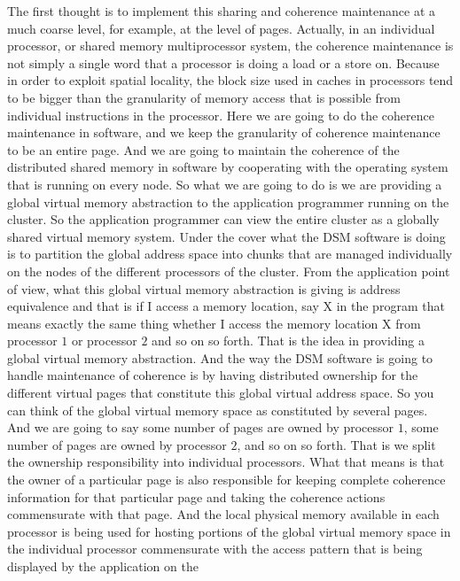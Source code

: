 \documentclass[11pt]{lecture}
\begin{document}
The first thought is to implement this sharing and coherence maintenance at a much coarse level, for example, 
at the level of pages. Actually, in an individual processor, or shared memory multiprocessor system, the 
coherence maintenance is not simply a single word that a processor is doing a load or a store on. Because 
in order to exploit spatial locality, the block size used in caches in processors tend to be bigger than the 
granularity of memory access that is possible from individual instructions in the processor. Here we are going to do 
the coherence maintenance in software, and we keep the granularity of coherence maintenance to be an 
entire page. And we are going to maintain the coherence of the distributed shared memory in software by cooperating with 
the operating system that is running on every node. So what we are going to do is we are providing a global 
virtual memory abstraction to the application programmer running on the cluster. So the application programmer 
can view the entire cluster as a globally shared virtual memory system. Under the cover what the DSM software 
is doing is to partition the global address space into chunks that are managed individually on the nodes of the different 
processors of the cluster. From the application point of view, what this global virtual memory abstraction is 
giving is address equivalence and that is if I access a memory location, say {\code X} in the program 
that means exactly the same thing whether I access the memory location {\code X} from processor $1$ or 
processor $2$ and so on so forth. That is the idea in providing a global virtual memory abstraction. And 
the way the DSM software is going to handle maintenance of coherence is by having distributed ownership for 
the different virtual pages that constitute this global virtual address space. So you can think of the global 
virtual memory space as constituted by several pages. And we are going to say some number of pages are 
owned by processor $1$, some number of pages are owned by processor $2$, and so on so forth. That is 
we split the ownership responsibility into individual processors. What that means is that the owner of 
a particular page is also responsible for keeping complete coherence information for that particular page and 
taking the coherence actions commensurate with that page. And the local physical memory 
available in each processor is being used for hosting portions of the global virtual memory space 
in the individual processor commensurate with the access pattern that is being displayed by the application on the 
\end{document}
